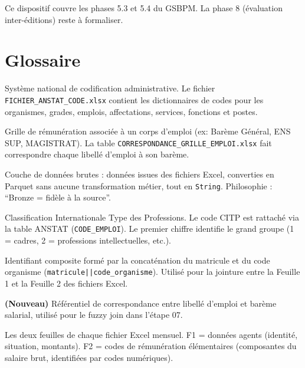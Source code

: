 \documentclass[12pt,a4paper,french]{report}
\begin{document}
Ce dispositif couvre les phases 5.3 et 5.4 du GSBPM. La phase 8 (évaluation
inter-éditions) reste à formaliser.

\chapter{Glossaire}

\begin{description}[leftmargin=3cm, labelwidth=2.8cm, style=nextline]

  \item[ANSTAT] Système national de codification administrative. Le fichier
  \texttt{FICHIER\_ANSTAT\_CODE.xlsx} contient les dictionnaires de codes pour
  les organismes, grades, emplois, affectations, services, fonctions et postes.

  \item[Barème salarial] Grille de rémunération associée à un corps d'emploi
  (ex: Barème Général, ENS SUP, MAGISTRAT). La table
  \texttt{CORRESPONDANCE\_GRILLE\_EMPLOI.xlsx} fait correspondre chaque libellé
  d'emploi à son barème.

  \item[Bronze] Couche de données brutes : données issues des fichiers Excel,
  converties en Parquet sans aucune transformation métier, tout en
  \texttt{String}. Philosophie : ``Bronze = fidèle à la source''.

  \item[CITP] Classification Internationale Type des Professions.
  Le code CITP est rattaché via la table ANSTAT (\texttt{CODE\_EMPLOI}).
  Le premier chiffre identifie le grand groupe (1 = cadres, 2 = professions
  intellectuelles, etc.).

  \item[CLE\_UNIQUE] Identifiant composite formé par la concaténation du
  matricule et du code organisme (\texttt{matricule||code\_organisme}).
  Utilisé pour la jointure entre la Feuille 1 et la Feuille 2 des fichiers
  Excel.

  \item[CORRESPONDANCE\_GRILLE\_EMPLOI.xlsx] \textbf{(Nouveau)} Référentiel
  de correspondance entre libellé d'emploi et barème salarial, utilisé pour
  le fuzzy join dans l'étape 07.

  \item[F1 / F2] Les deux feuilles de chaque fichier Excel mensuel.
  F1 = données agents (identité, situation, montants).
  F2 = codes de rémunération élémentaires (composantes du salaire brut,
  identifiées par codes numériques).


\end{description}
\end{document}
